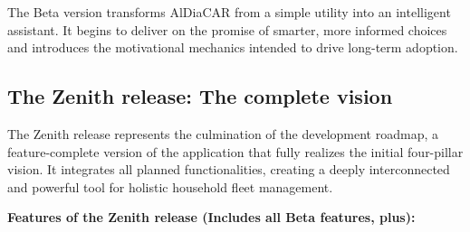 The Beta version transforms AlDiaCAR from a simple utility into an intelligent assistant. It begins to deliver on the promise of smarter, more informed choices and introduces the motivational mechanics intended to drive long-term adoption.

\subsection{The Zenith release: The complete vision}

The Zenith release represents the culmination of the development roadmap, a feature-complete version of the application that fully realizes the initial four-pillar vision. It integrates all planned functionalities, creating a deeply interconnected and powerful tool for holistic household fleet management.

\textgap

\textbf{Features of the Zenith release (Includes all Beta features, plus):}

